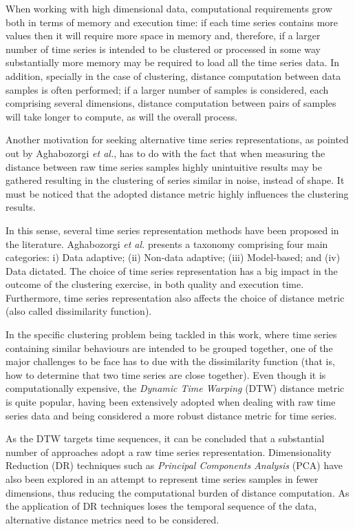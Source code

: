 \documentclass[9pt,journal,compsoc]{IEEEtran}
\begin{document}
When working with high dimensional data, computational requirements grow both in terms of memory and execution time: if each time series contains more values then it will require more space in memory and, therefore, if a larger number of time series is intended to be clustered or processed in some way substantially more memory may be required to load all the time series data. In addition, specially in the case of clustering, distance computation between data samples is often performed; if a larger number of samples is considered, each comprising several dimensions, distance computation between pairs of samples will take longer to compute, as will the overall process.

Another motivation for seeking alternative time series representations, as pointed out by Aghabozorgi \emph{et al.}\cite{aghabozorgi2015time}, has to do with the fact that when measuring the distance between raw time series samples highly unintuitive results may be gathered resulting in the clustering of series similar in noise, instead of shape. It must be noticed that the adopted distance metric highly influences the clustering results.

In this sense, several time series representation methods have been proposed in the literature. Aghabozorgi \emph{et al.} presents a taxonomy comprising four main categories: i) Data adaptive; (ii) Non-data adaptive; (iii) Model-based; and (iv) Data dictated. The choice of time series representation has a big impact in the outcome of the clustering exercise, in both quality and execution time. Furthermore, time series representation also affects the choice of distance metric (also called dissimilarity function).

In the specific clustering problem being tackled in this work, where time series containing similar behaviours are intended to be grouped together, one of the major challenges to be face has to due with the dissimilarity function (that is, how to determine that two time series are close together). Even though it is computationally expensive, the \emph{Dynamic Time Warping} (DTW)\cite{chu2002iterative} distance metric is quite popular, having been extensively adopted when dealing with raw time series data\cite{liao2005clustering, petitjean2014dynamic, izakian2015fuzzy, aghabozorgi2015time} and being considered a more robust distance metric for time series\cite{wang2013experimental}. 

As the DTW targets time sequences, it can be concluded that a substantial number of approaches adopt a raw time series representation. Dimensionality Reduction (DR) techniques such as \emph{Principal Components Analysis} (PCA) have also been explored \cite{abreu2012using} in an attempt to represent time series samples in fewer dimensions, thus reducing the computational burden of distance computation. As the application of DR techniques loses the temporal sequence of the data, alternative distance metrics need to be considered.
\end{document}
